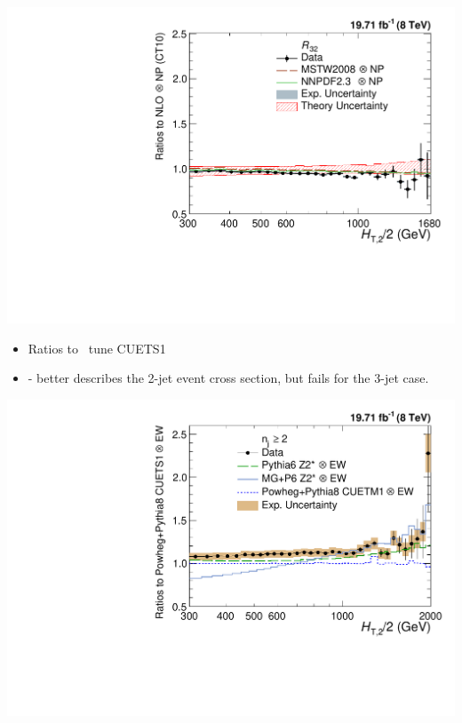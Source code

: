 \documentclass{beamer}
\begin{document}
\begin{frame}
\includegraphics[scale = 0.215]{Plots_HT_2_150/Comparison_data_NLO_Pdfs_ratio_32.pdf}
\begin{itemize}
\item {\scriptsize Ratios to \POWHEG \plusn \PYTHIAE~tune CUETS1\\}
\item[] {\scriptsize -  better describes the 2-jet event cross section, but fails for the 3-jet case.\\}
\end{itemize}
\hspace{-5.3mm}
\includegraphics[scale = 0.215]{Plots_HT_2_150/Comparison_data_MC_samples_2_Pow_EW.pdf}%

\end{frame}
\end{document}
